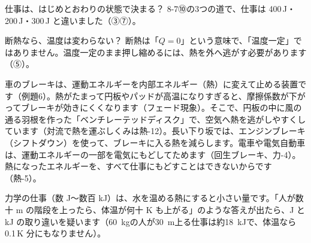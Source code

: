 \begin{tsumazuki}{仕事は、はじめとおわりの状態で決まる？}
8-7⑩の3つの道で、仕事は 400\,J・200\,J・300\,J と違いました（③⑦）。
\end{tsumazuki}

\begin{tsumazuki}{断熱なら、温度は変わらない？}
断熱は「$Q=0$」という意味で、「温度一定」ではありません。温度一定のまま押し縮めるには、熱を外へ逃がす必要があります（⑤）。
\end{tsumazuki}

\begin{phkougaku}
車のブレーキは、運動エネルギーを内部エネルギー（熱）に変えて止める装置です（例題6）。熱がたまって円板やパッドが高温になりすぎると、摩擦係数が下がってブレーキが効きにくくなります（フェード現象）。そこで、円板の中に風の通る羽根を作った「ベンチレーテッドディスク」で、空気へ熱を逃がしやすくしています（対流で熱を運ぶしくみは熱-12）。長い下り坂では、エンジンブレーキ（シフトダウン）を使って、ブレーキに入る熱を減らします。電車や電気自動車は、運動エネルギーの一部を電気にもどしてためます（回生ブレーキ、力-4）。熱になったエネルギーを、すべて仕事にもどすことはできないからです（熱-5）。

\begin{phketa}[熱と仕事の大きさ]
力学の仕事（数 J〜数百 kJ）は、水を温める熱にすると小さい量です。「人が数十 m の階段を上ったら、体温が何十 K も上がる」のような答えが出たら、J と kJ の取り違いを疑います（\qty{60}{kg}の人が\qty{30}{m}上る仕事は約\qty{18}{kJ}で、体温なら0.1\,K 分にもなりません）。
\end{phketa}
\end{phkougaku}

